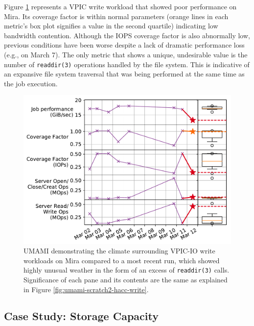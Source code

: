 Figure \ref{fig:umami-mira-fs1-vpic-write} represents a VPIC write workload
that showed poor performance on Mira.
Its coverage factor is within normal parameters (orange lines in each metric's box plot signifies a value in the second quartile) indicating low bandwidth contention.
Although the IOPS coverage factor is also abnormally low, previous conditions have been worse despite a lack of dramatic performance loss (e.g., on March 7).
The only metric that shows a unique, undesirable value is the number of \texttt{readdir(3)} operations handled by the file system.
This is indicative of an expansive file system traversal that was being performed at the same time as the job execution.

\begin{figure}[t]
    \centering
    \includegraphics[width=1.0\columnwidth]{figs/umami-mira-fs1-vpic-write.pdf}
    \caption{UMAMI demonstrating the climate surrounding VPIC-IO write workloads on Mira compared to a most recent run, which showed highly unusual weather in the form of an excess of \texttt{readdir(3)} calls.
    Significance of each pane and its contents are the same as explained in Figure \ref{fig:umami-scratch2-hacc-write}.}
    \label{fig:umami-mira-fs1-vpic-write}
\vspace{-.2in}
\end{figure}

\subsection{Case Study: Storage Capacity}

